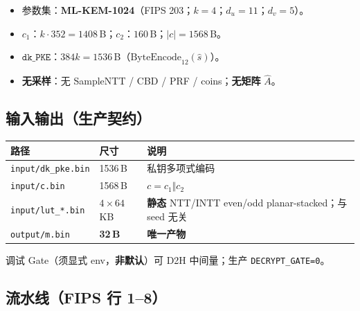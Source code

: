 \documentclass[UTF8,a4paper,11pt]{ctexart}
\begin{document}
\begin{itemize}
  \item 参数集：\textbf{ML-KEM-1024}（FIPS 203；$k=4$；$d_u=11$；$d_v=5$）。
  \item $c_1$：$k\cdot 352=1408$\,B；$c_2$：$160$\,B；$|c|=1568$\,B。
  \item $\texttt{dk\_PKE}$：$384k=1536$\,B（$\mathrm{ByteEncode}_{12}(\hat{s})$）。
  \item \textbf{无采样}：无 SampleNTT / CBD / PRF / coins；\textbf{无矩阵} $\hat{A}$。
\end{itemize}

\subsection{输入输出（生产契约）}

\begin{longtable}{@{}L{3.5cm}L{2.2cm}L{7.5cm}@{}}
\toprule
路径 & 尺寸 & 说明 \\
\midrule
\texttt{input/dk\_pke.bin} & 1536\,B & 私钥多项式编码 \\
\texttt{input/c.bin} & 1568\,B & $c=c_1\Vert c_2$ \\
\texttt{input/lut\_*.bin} & $4\times 64$\,KB & \textbf{静态} NTT/INTT even/odd planar-stacked；与 seed 无关 \\
\texttt{output/m.bin} & \textbf{32\,B} & \textbf{唯一产物} \\
\bottomrule
\end{longtable}

调试 Gate（须显式 env，\textbf{非默认}）可 D2H 中间量；生产 \texttt{DECRYPT\_GATE=0}。

\subsection{流水线（FIPS 行 1--8）}
\end{document}
